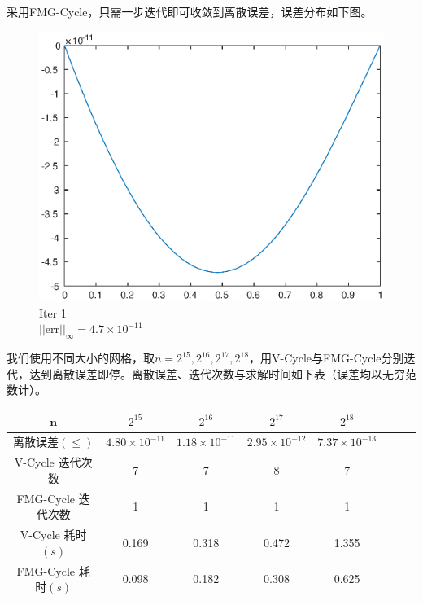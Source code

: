 \documentclass[lang=cn,10pt]{elegantbook}
\begin{document}
采用FMG-Cycle，只需一步迭代即可收敛到离散误差，误差分布如下图。

\begin{figure}[H]
  \centering
  \begin{minipage}[t]{0.24\linewidth}
      \centering
      \includegraphics[width=0.9\linewidth]{figure/1-4-5.eps}
      \caption*{\small Iter 1 \\ $||\text{err}||_\infty=4.7\times 10^{-11}$}
  \end{minipage}
\end{figure}

我们使用不同大小的网格，取$n=2^{15},2^{16},2^{17},2^{18}$，用V-Cycle与FMG-Cycle分别迭代，达到离散误差即停。离散误差、迭代次数与求解时间如下表（误差均以无穷范数计）。

\begin{table}[H]
  \centering
  \small
  \begin{tabular}{c|ccccccc}
   $\mathbf{n}$      & $2^{15}$                   & $2^{16}$                   & $2^{17}$                  & $2^{18}$                    \\ \hline
离散误差$(\leq)$   & $4.80\times 10^{-11}$ & $1.18\times 10^{-11}$ & $2.95\times 10^{-12}$ & $7.37\times 10^{-13}$ \\
V-Cycle 迭代次数   & 7 & 7 & 8 & 7 \\
FMG-Cycle 迭代次数   & 1 & 1 & 1 & 1 \\
V-Cycle 耗时$(s)$  & 0.169 & 0.318 & 0.472 & 1.355 \\
FMG-Cycle 耗时$(s)$ & 0.098 & 0.182 & 0.308 & 0.625 
\end{tabular}
\end{table}
\end{document}
